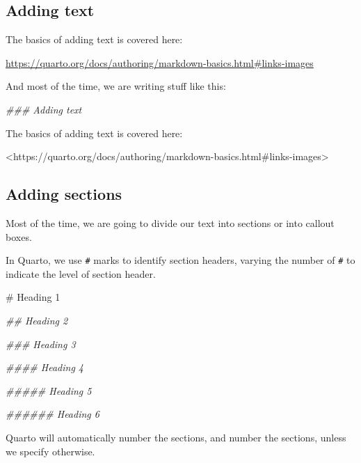 \documentclass[
  letterpaper,
  DIV=11,
  numbers=noendperiod]{scrreprt}
\newenvironment{Shaded}{\begin{snugshade}}{\end{snugshade}}
\newcommand{\CommentTok}[1]{\textcolor[rgb]{0.37,0.37,0.37}{#1}}
\newcommand{\DocumentationTok}[1]{\textcolor[rgb]{0.37,0.37,0.37}{\textit{#1}}}
\newcommand{\ErrorTok}[1]{\textcolor[rgb]{0.68,0.00,0.00}{#1}}
\newcommand{\NormalTok}[1]{\textcolor[rgb]{0.00,0.23,0.31}{#1}}
\newcommand{\SpecialCharTok}[1]{\textcolor[rgb]{0.37,0.37,0.37}{#1}}
\begin{document}
\subsection{Adding text}\label{adding-text}

The basics of adding text is covered here:

\url{https://quarto.org/docs/authoring/markdown-basics.html\#links-images}

And most of the time, we are writing stuff like this:

\begin{Shaded}
\begin{Highlighting}[]
\DocumentationTok{\#\#\# Adding text}

\NormalTok{The basics of adding text is covered here}\SpecialCharTok{:} 

\ErrorTok{\textless{}}\NormalTok{https}\SpecialCharTok{:}\ErrorTok{//}\NormalTok{quarto.org}\SpecialCharTok{/}\NormalTok{docs}\SpecialCharTok{/}\NormalTok{authoring}\SpecialCharTok{/}\NormalTok{markdown}\SpecialCharTok{{-}}\NormalTok{basics.html}\CommentTok{\#links{-}images\textgreater{}}
\end{Highlighting}
\end{Shaded}

\subsection{Adding sections}\label{adding-sections}

Most of the time, we are going to divide our text into sections or into
callout boxes.

In Quarto, we use \texttt{\#} marks to identify section headers, varying
the number of \texttt{\#} to indicate the level of section header.

\begin{Shaded}
\begin{Highlighting}[]
\CommentTok{\# Heading 1}

\DocumentationTok{\#\# Heading 2}

\DocumentationTok{\#\#\# Heading 3}

\DocumentationTok{\#\#\#\# Heading 4}

\DocumentationTok{\#\#\#\#\# Heading 5}

\DocumentationTok{\#\#\#\#\#\# Heading 6}
\end{Highlighting}
\end{Shaded}

Quarto will automatically number the sections, and number the sections,
unless we specify otherwise.
\end{document}
